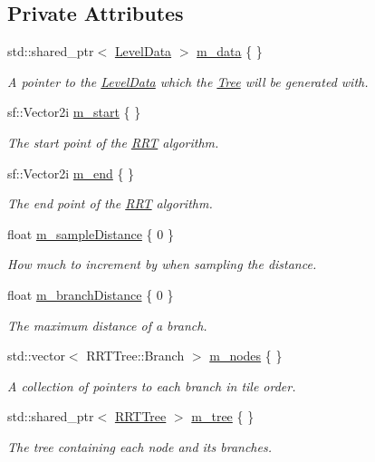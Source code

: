 \subsection*{Private Attributes}
\begin{DoxyCompactItemize}
\item 
std\+::shared\+\_\+ptr$<$ \hyperlink{classLevelData}{Level\+Data} $>$ \hyperlink{classRRT_a4990cccae7cd2160f1fa6e970242365a}{m\+\_\+data} \{ \}
\begin{DoxyCompactList}\small\item\em A pointer to the \hyperlink{classLevelData}{Level\+Data} which the \hyperlink{classTree}{Tree} will be generated with. \end{DoxyCompactList}\item 
sf\+::\+Vector2i \hyperlink{classRRT_a4f0394ed9f6cd596f13b19a1617e56f9}{m\+\_\+start} \{ \}
\begin{DoxyCompactList}\small\item\em The start point of the \hyperlink{classRRT}{R\+R\+T} algorithm. \end{DoxyCompactList}\item 
sf\+::\+Vector2i \hyperlink{classRRT_a96f886227de84066adb285cbc6dcb2f5}{m\+\_\+end} \{ \}
\begin{DoxyCompactList}\small\item\em The end point of the \hyperlink{classRRT}{R\+R\+T} algorithm. \end{DoxyCompactList}\item 
float \hyperlink{classRRT_ad1501f1319a73e96ebdc3a9bb76dbdca}{m\+\_\+sample\+Distance} \{ 0 \}
\begin{DoxyCompactList}\small\item\em How much to increment by when sampling the distance. \end{DoxyCompactList}\item 
float \hyperlink{classRRT_a2aaaa69617cfd685ae1d504e3cf31317}{m\+\_\+branch\+Distance} \{ 0 \}
\begin{DoxyCompactList}\small\item\em The maximum distance of a branch. \end{DoxyCompactList}\item 
std\+::vector$<$ R\+R\+T\+Tree\+::\+Branch $>$ \hyperlink{classRRT_a25e924b6450a7dc97c4ecff2735b5889}{m\+\_\+nodes} \{ \}
\begin{DoxyCompactList}\small\item\em A collection of pointers to each branch in tile order. \end{DoxyCompactList}\item 
std\+::shared\+\_\+ptr$<$ \hyperlink{RRT_8hpp_ad96bf2a5632cc2b01900b403e90b1607}{R\+R\+T\+Tree} $>$ \hyperlink{classRRT_a2905ea09c16ae59d6ee1beae15d12b2e}{m\+\_\+tree} \{ \}
\begin{DoxyCompactList}\small\item\em The tree containing each node and its branches. \end{DoxyCompactList}\end{DoxyCompactItemize}


